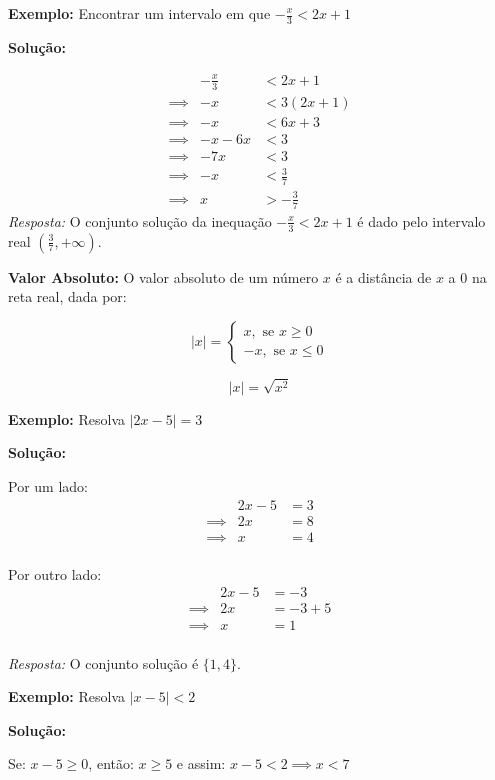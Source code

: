 \documentclass[oneside,a4paper,12pt]{article}
\begin{document}
\textbf{Exemplo:} Encontrar um intervalo em que $ \displaystyle -\frac{x}{3} < 2x + 1$

{\bf Solução:}

\begin{eqnarray*}
&  \displaystyle -\frac{x}{3} & < 2x + 1 \\ 
\implies & -x & < 3(2x + 1) \\
\implies & -x & < 6x + 3 \\
\implies & -x -6x & < 3 \\
\implies & -7x & < 3 \\
\implies & -x & < \frac{3}{7} \\
\implies & x & > - \frac{3}{7}
\end{eqnarray*}
{\it Resposta:} O conjunto solução da inequação $\displaystyle -\frac{x}{3} < 2x + 1$ é dado pelo intervalo real $\left(\displaystyle \frac{3}{7},+\infty\right)$.

\textbf{Valor Absoluto:} O valor absoluto de um número $x$ é a distância de $x$ a $0$ na reta real, dada por:

$$|x| = 
\begin{cases}
x, \text{  se } x \geq 0 \\
-x, \text{ se } x \leq 0
\end{cases}
$$

$$|x| = \sqrt{x^{2}} $$

\textbf{Exemplo:} Resolva $|2x - 5| = 3$

{\bf Solução:}

Por um lado:
\begin{eqnarray*}
	&  2x-5 & = 3 \\ 
	\implies & 2x & = 8 \\
	\implies & x & = 4 \\
\end{eqnarray*}

Por outro lado:
\begin{eqnarray*}
	&  2x-5 & = -3 \\ 
	\implies & 2x & = -3 + 5 \\
	\implies & x & = 1 \\
\end{eqnarray*}

{\it Resposta:} O conjunto solução é $\{1,4\}$.

\textbf{Exemplo:} Resolva $|x - 5| < 2$

{\bf Solução:}

Se: $x - 5 \geq 0$, então: $x \geq 5$ e assim: $x - 5 < 2 \implies x < 7$
\end{document}
